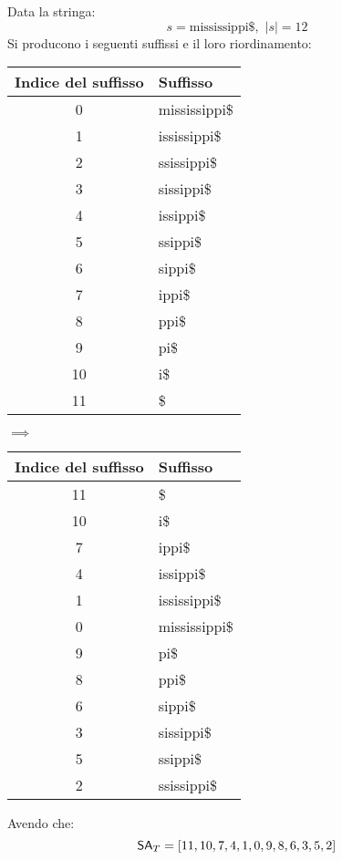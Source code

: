 \begin{esempio}
  Data la stringa:
  \[s=\mbox{mississippi\$},\,\,|s|=12\]
  Si producono i seguenti suffissi e il loro riordinamento:
  \begin{table}[H]
    \footnotesize
    \centering
    \begin{tabular}{c|l}
      \textbf{Indice del suffisso} & \textbf{Suffisso}\\
      \hline
      0 & mississippi\$\\
      1 & ississippi\$\\
      2 & ssissippi\$\\
      3 & sissippi\$\\
      4 & issippi\$\\
      5 & ssippi\$\\
      6 & sippi\$\\
      7 & ippi\$\\
      8 & ppi\$\\
      9 & pi\$\\
      10 & i\$\\
      11 & \$\\
    \end{tabular}
    \quad $\implies$\quad
    \begin{tabular}{c|l} 
      \textbf{Indice del suffisso} & \textbf{Suffisso}\\ 
      \hline
      11 & \$\\
      10 & i\$\\
      7 & ippi\$\\
      4 & issippi\$\\
      1 & ississippi\$\\
      0 & mississippi\$\\
      9 & pi\$\\
      8 & ppi\$\\
      6 & sippi\$\\
      3 & sissippi\$\\
      5 & ssippi\$\\
      2 & ssissippi\$\\
    \end{tabular}
  \end{table}
  Avendo che:
  \[\mbox{\rm {\sf SA}}_T=[11,10,7,4,1,0,9,8,6,3,5,2]\]
\end{esempio}
